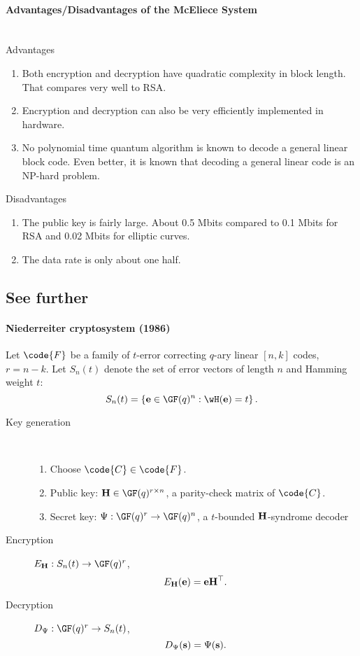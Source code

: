 \documentclass[a4paper, 11pt, openany]{book}
\begin{document}
\paragraph{Advantages/Disadvantages of the McEliece System}~\\
Advantages
\begin{enumerate}
\item Both encryption and decryption have quadratic
complexity in block length. That compares very well to RSA.

\item Encryption and decryption can also be very efficiently implemented in hardware.

\item No polynomial time quantum algorithm is known to
decode a general linear block code. Even better, it is known
that decoding a general linear code is an NP-hard
problem.
\end{enumerate}

Disadvantages
\begin{enumerate}
	\item The public key is fairly large. About 0.5 Mbits compared to 0.1 Mbits for RSA and 0.02 Mbits for elliptic curves.

	\item The data rate is only about one half.
\end{enumerate}


\subsection{See further}

\paragraph{Niederreiter cryptosystem (1986)}
Let $\code{F}$ be a family of $t$-error correcting $q$-ary linear $[n,k]$ codes, $r = n-k$. Let $S_n(t)$ denote the set of error vectors of length $n$ and Hamming weight $t$:
\[
    S_n(t) = \left\{ {\bf e} \in \GF(q)^n : \wH({\bf e}) = t \right\}.
\]

\begin{description}
\item[Key generation]~
\begin{enumerate}
    \item Choose $\code{C} \in \code{F}$.

    \item Public key: ${\bf H} \in \GF(q)^{r \times n}$, a parity-check matrix of $\code{C}$.

    \item Secret key: $\Psi : \GF(q)^r \to \GF(q)^n$, a $t$-bounded ${\bf H}$-syndrome decoder
\end{enumerate}


\item[Encryption] $E_{\bf H} : S_n(t) \to \GF(q)^r$,
\[
    E_{\bf H}( {\bf e} ) = {\bf e} {\bf H}^\top.
\]

\item[Decryption] $D_\Psi : \GF(q)^r \to S_n(t)$,
\[
    D_\Psi( {\bf s}) = \Psi({\bf s}).
\]

\end{description}
\end{document}
